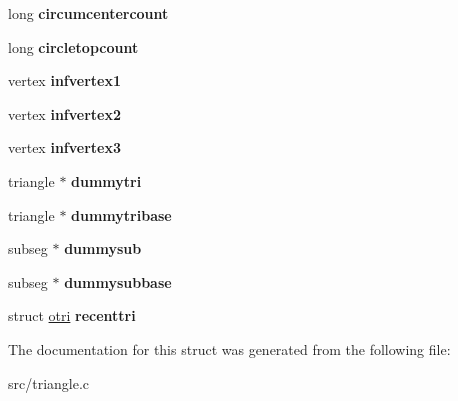 \begin{DoxyCompactItemize}
\item 
\hypertarget{structmesh_a1ba65d762f34347b9f2dcb6f172636bd}{
long {\bfseries circumcentercount}}
\label{structmesh_a1ba65d762f34347b9f2dcb6f172636bd}

\item 
\hypertarget{structmesh_a9b54a570701c2bf248cf03438a1affc9}{
long {\bfseries circletopcount}}
\label{structmesh_a9b54a570701c2bf248cf03438a1affc9}

\item 
\hypertarget{structmesh_ac2d8384391395619b4dbda40b6bbddfd}{
vertex {\bfseries infvertex1}}
\label{structmesh_ac2d8384391395619b4dbda40b6bbddfd}

\item 
\hypertarget{structmesh_af1d3d858c7cbd4122b978143c0b08c4b}{
vertex {\bfseries infvertex2}}
\label{structmesh_af1d3d858c7cbd4122b978143c0b08c4b}

\item 
\hypertarget{structmesh_a530fa3d54ca3b95b34fbc233926ac185}{
vertex {\bfseries infvertex3}}
\label{structmesh_a530fa3d54ca3b95b34fbc233926ac185}

\item 
\hypertarget{structmesh_aeb2991e8af23a60d34462e28cd3881fb}{
triangle $\ast$ {\bfseries dummytri}}
\label{structmesh_aeb2991e8af23a60d34462e28cd3881fb}

\item 
\hypertarget{structmesh_a93c385f82ea2bf1c0d0b794824bef716}{
triangle $\ast$ {\bfseries dummytribase}}
\label{structmesh_a93c385f82ea2bf1c0d0b794824bef716}

\item 
\hypertarget{structmesh_ac3956fb994a62f704af23ceb16680ff8}{
subseg $\ast$ {\bfseries dummysub}}
\label{structmesh_ac3956fb994a62f704af23ceb16680ff8}

\item 
\hypertarget{structmesh_a5c152aa62e1ee91832c176920164c2a7}{
subseg $\ast$ {\bfseries dummysubbase}}
\label{structmesh_a5c152aa62e1ee91832c176920164c2a7}

\item 
\hypertarget{structmesh_a3fe1c34473c1475118c2253d7cafb17c}{
struct \hyperlink{structotri}{otri} {\bfseries recenttri}}
\label{structmesh_a3fe1c34473c1475118c2253d7cafb17c}

\end{DoxyCompactItemize}


The documentation for this struct was generated from the following file:\begin{DoxyCompactItemize}
\item 
src/triangle.c\end{DoxyCompactItemize}
